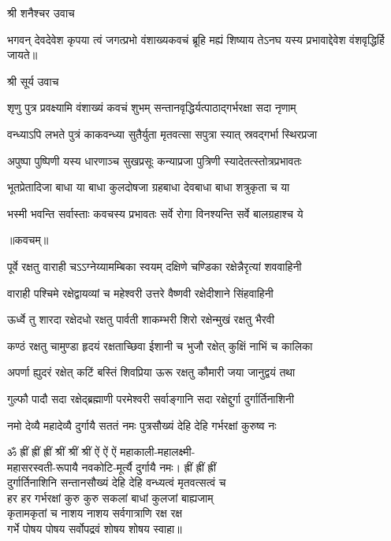 
\centerline{श्री शनैश्चर उवाच}

\twolineshloka
{भगवन् देवदेवेश कृपया त्वं जगत्प्रभो}
{वंशाख्यकवचं ब्रूहि मह्यं शिष्याय तेऽनघ}%
{यस्य प्रभावाद्देवेश वंशवृद्धिर्हि जायते॥}

\centerline{श्री सूर्य उवाच}

\twolineshloka
{शृणु पुत्र प्रवक्ष्यामि वंशाख्यं कवचं शुभम्}
{सन्तानवृद्धिर्यत्पाठाद्गर्भरक्षा सदा नृणाम्}%

\twolineshloka
{वन्ध्याऽपि लभते पुत्रं काकवन्ध्या सुतैर्युता}
{मृतवत्सा सपुत्रा स्यात् स्रवद्गर्भा स्थिरप्रजा}%

\twolineshloka
{अपुष्पा पुष्पिणी यस्य धारणाञ्च सुखप्रसूः}
{कन्याप्रजा पुत्रिणी स्यादेतत्स्तोत्रप्रभावतः}%


\twolineshloka
{भूतप्रेतादिजा बाधा या बाधा कुलदोषजा}
{ग्रहबाधा देवबाधा बाधा शत्रुकृता च या}%

\twolineshloka
{भस्मी भवन्ति सर्वास्ताः कवचस्य प्रभावतः}
{सर्वे रोगा विनश्यन्ति सर्वे बालग्रहाश्च ये}%

\centerline{॥कवचम्॥}

\twolineshloka
{पूर्वे रक्षतु वाराही चऽऽग्नेय्यामम्बिका स्वयम्}
{दक्षिणे चण्डिका रक्षेन्नैरृत्यां शववाहिनी}%

\twolineshloka
{वाराही पश्चिमे रक्षेद्वायव्यां च महेश्वरी}
{उत्तरे वैष्णवी रक्षेदीशाने सिंहवाहिनी}%

\twolineshloka
{ऊर्ध्वे तु शारदा रक्षेदधो रक्षतु पार्वती}
{शाकम्भरी शिरो रक्षेन्मुखं रक्षतु भैरवी}%

\twolineshloka
{कण्ठं रक्षतु चामुण्डा हृदयं रक्षताच्छिवा}
{ईशानी च भुजौ रक्षेत् कुक्षिं नाभिं च कालिका}%

\twolineshloka
{अपर्णा ह्युदरं रक्षेत् कटिं बस्तिं शिवप्रिया}
{ऊरू रक्षतु कौमारी जया जानुद्वयं तथा}%

\twolineshloka
{गुल्फौ पादौ सदा रक्षेद्ब्रह्माणी परमेश्वरी}
{सर्वाङ्गानि सदा रक्षेद्दुर्गा दुर्गार्तिनाशिनी}%

\twolineshloka
{नमो देव्यै महादेव्यै दुर्गायै सततं नमः}
{पुत्रसौख्यं देहि देहि गर्भरक्षां कुरुष्व नः}%

ॐ ह्रीं ह्रीं ह्रीं श्रीं श्रीं श्रीं ऐं ऐं ऐं महाकाली-महालक्ष्मी-\\
महासरस्वती-रूपायै नवकोटि-मूर्त्यै दुर्गायै नमः। ह्रीं ह्रीं ह्रीं\\
दुर्गार्तिनाशिनि सन्तानसौख्यं देहि देहि वन्ध्यत्वं मृतवत्सत्वं च\\
हर हर गर्भरक्षां कुरु कुरु सकलां बाधां कुलजां बाह्यजाम्\\
कृतामकृतां च नाशय नाशय सर्वगात्राणि रक्ष रक्ष \\
गर्भे पोषय पोषय सर्वोपद्रवं शोषय शोषय स्वाहा॥

